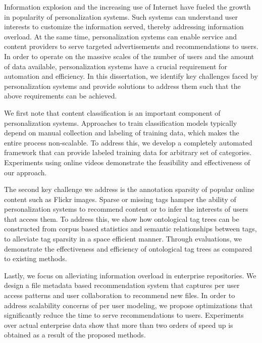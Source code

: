 \documentclass[12pt]{ucsddissertation}
\begin{document}
\begin{dissertationabstract}


Information explosion and the increasing use of Internet have fueled the growth in popularity of personalization systems. Such systems can understand user interests to customize the information served, thereby addressing information overload. At the same time, personalization systems can enable service and content providers to serve targeted advertisements and recommendations to users. In order to operate on the massive scales of the number of users and the amount of data available, personalization systems have a crucial requirement for automation and efficiency. In this dissertation, we identify key challenges faced by personalization systems and provide solutions to address them such that the above requirements can be achieved. 

We first note that content classification is an important component of personalization systems. Approaches to train classification models typically depend on manual collection and labeling of training data, which makes the entire process non-scalable. To address this, we develop a completely automated framework that can provide labeled training data for arbitrary set of categories. Experiments using online videos demonstrate the feasibility and effectiveness of our approach. 


The second key challenge we address is the annotation sparsity of popular online content such as Flickr images. Sparse or missing tags hamper the ability of personalization systems to recommend content or to infer the interests of users that access them. To address this, we show how ontological tag trees can be constructed from corpus based statistics and semantic relationships between tags, to alleviate tag sparsity in a space efficient manner. Through evaluations, we demonstrate the effectiveness and efficiency of ontological tag trees as compared to existing methods. 


Lastly, we focus on alleviating information overload in enterprise repositories. We design a file metadata based recommendation system that captures per user access patterns and user collaboration to recommend new files. In order to address scalability concerns of per user modeling, we propose optimizations that significantly reduce the time to serve recommendations to users. Experiments over actual enterprise data show that more than two orders of speed up is obtained as a result of the proposed methods. 



\end{dissertationabstract}
\end{document}
